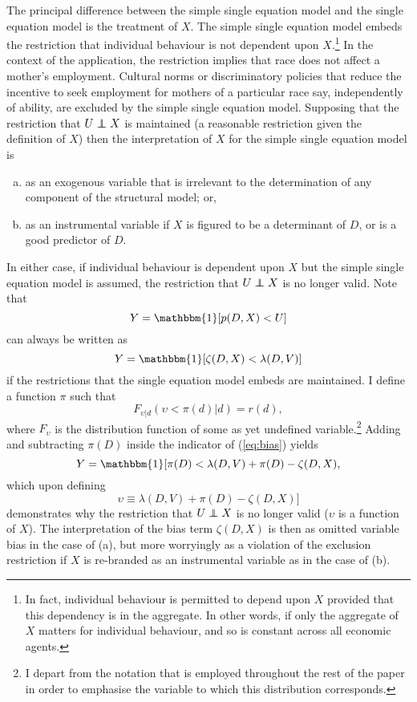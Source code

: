 \documentclass[10pt,a4paper,twoside]{article}
\newcommand\independent{\protect\mathpalette{\protect\independenT}{\perp}}
\def\independenT#1#2{\mathrel{\rlap{$#1#2$}\mkern2mu{#1#2}}}
\numberwithin{equation}{section}
\begin{document}
The principal difference between the simple single equation model and the single equation model is the treatment of $X$. The simple single equation model embeds the restriction that individual behaviour is not dependent upon $X$.\footnote{In fact, individual behaviour is permitted to depend upon $X$ provided that this dependency is in the aggregate. In other words, if only the aggregate of $X$ matters for individual behaviour, and so is constant across all economic agents.} In the context of the application, the restriction implies that race does not affect a mother's employment. Cultural norms or discriminatory policies that reduce the incentive to seek employment for mothers of a particular race say, independently of ability, are excluded by the simple single equation model. Supposing that the restriction that $U\independent X$ is maintained (a reasonable restriction given the definition of $X$) then the interpretation of $X$ for the simple single equation model is 
\begin{enumerate}[(a)]
\item as an exogenous variable that is irrelevant to the determination of any component of the structural model; or,
\item as an instrumental variable if $X$ is figured to be a determinant of $D$, or is a good predictor of $D$.
\end{enumerate}   
In either case, if individual behaviour is dependent upon $X$ but the simple single equation model is assumed, the restriction that $U\independent X$ is no longer valid. Note that
\[Y=\mathbbm{1}[p(D,X)<U]\]
can always be written as
\begin{equation}
Y=\mathbbm{1}[\zeta(D,X)<\lambda(D,V)]\label{eq:bias}
\end{equation}
if the restrictions that the single equation model embeds are maintained. I define a function $\pi$ such that
\[F_{\upsilon|d}(\upsilon<\pi(d)|d)=r(d),\] 
where $F_\upsilon$ is the distribution function of some as yet undefined variable.\footnote{I depart from the notation that is employed throughout the rest of the paper in order to emphasise the variable to which this distribution corresponds.} Adding and subtracting $\pi(D)$ inside the indicator of (\ref{eq:bias}) yields
\[Y=\mathbbm{1}[\pi(D)<\lambda(D,V)+\pi(D)-\zeta(D,X),\]
which upon defining 
\[\upsilon\equiv\lambda(D,V)+\pi(D)-\zeta(D,X)]\]
demonstrates why the restriction that $U\independent X$ is no longer valid ($\upsilon$ is a function of $X$). The interpretation of the bias term $\zeta(D,X)$ is then as omitted variable bias in the case of (a), but more worryingly as a violation of the exclusion restriction if $X$ is re-branded as an instrumental variable as in the case of (b). 
\end{document}
